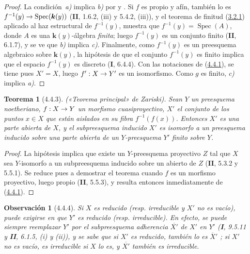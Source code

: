 \documentclass[10pt,oneside,openany]{book}
\theoremstyle{egaenv}\newtheorem*{env}{---}
\theoremstyle{egastatement}
\newtheorem*{theorem}{Teorema}
\theoremstyle{egadescription}
\newtheorem*{remark}{Observación}
\renewcommand{\to}{\mathchoice{\longrightarrow}{\rightarrow}{\rightarrow}{\rightarrow}}
\begin{document}
\begin{proof}
La condición~\emph{a)} implica \emph{b)} por  y
. Si $f$ es propio y afín, también lo es
$f^{-1}(y)\to\operatorname{Spec}(\boldsymbol{k}(y))$ (\textbf{II}, 1.6.2, (iii) y 5.4.2, (iii)), y el teorema de finitud (\hyperref[III.3.2.1-fr]{3.2.1}) aplicado al haz estructural de $f^{-1}(y)$, muestra
que $f^{-1}(y)=\operatorname{Spec}(A)$, donde
$A$ es una $\boldsymbol{k}(y)$-álgebra \emph{finita}; luego $f^{-1}(y)$ es un conjunto finito (\textbf{II}, 6.1.7), y se ve que \emph{b)} implica \emph{c)}. Finalmente, como $f^{-1}(y)$ es un preesquema
algebraico sobre $\boldsymbol{k}(y)$, la hipótesis de que el conjunto $f^{-1}(y)$ es
finito implica que el espacio $f^{-1}(y)$ es discreto (\textbf{I}, 6.4.4). Con las
notaciones de (\hyperref[III.4.4.1-fr]{4.4.1}), se tiene pues $X'=X$, luego
$f':X\to Y'$ es un isomorfismo. Como $g$ es finito, \emph{c)} implica \emph{a)}.
\end{proof}

\begin{theorem}[4.4.3]
\label{III.4.4.3-fr}
\textnormal{(«Teorema principal» de Zariski).}
Sean $Y$ un preesquema noetheriano, $f:X\to Y$ un morfismo cuasiproyectivo,
$X'$ el conjunto de los puntos $x\in X$ que están aislados en su fibra
$f^{-1}(f(x))$. Entonces $X'$ es una parte abierta de $X$, y el
subpreesquema inducido $X'$ es isomorfo a un preesquema inducido sobre una parte
abierta de un $Y$-preesquema $Y'$ finito sobre $Y$.
\end{theorem}

\begin{proof}
La hipótesis implica que existe un $Y$-preesquema proyectivo $Z$ tal que $X$
sea $Y$-isomorfo a un subpreesquema inducido sobre un abierto de $Z$
(\textbf{II}, 5.3.2 y 5.5.1). Se reduce pues a demostrar el teorema cuando $f$
es un morfismo proyectivo, luego propio (\textbf{II}, 5.5.3), y resulta entonces
inmediatamente de (\hyperref[III.4.4.1-fr]{4.4.1}).
\end{proof}

\begin{remark}[4.4.4]
\label{III.4.4.4-fr}
Si $X$ es reducido (resp. irreducible y $X'$ no
es vacío), puede exigirse en  que $Y'$ es reducido (resp. irreducible). En efecto, se puede siempre reemplazar $Y'$ por el subpreesquema \emph{adherencia} $\overline{X'}$ de $X'$ en $Y'$ (\textbf{I}, 9.5.11 y \textbf{II}, 6.1.5, (i) y (ii)), y se sabe que si $X'$ es reducido, también
lo es $\overline{X}'$ ; si $X'$ no es vacío, es
irreducible si $X$ lo es, y $\overline{X'}$ también es irreducible.
\end{remark}
\end{document}
